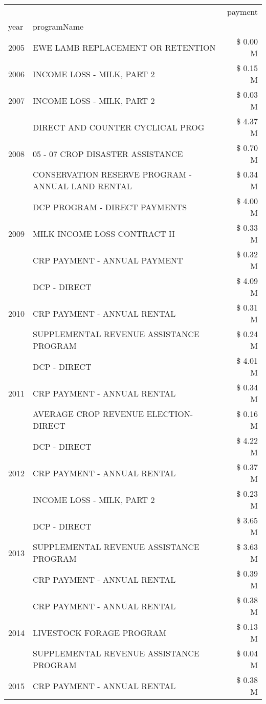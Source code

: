 \begin{tabular}{llr}
\toprule
 &  & payment \\
year & programName &  \\
\midrule
2005 & EWE LAMB REPLACEMENT OR RETENTION & \$ 0.00 M \\
\cline{1-3}
2006 & INCOME LOSS - MILK, PART 2 & \$ 0.15 M \\
\cline{1-3}
2007 & INCOME LOSS - MILK, PART 2 & \$ 0.03 M \\
\cline{1-3}
\multirow[t]{3}{*}{2008} & DIRECT AND COUNTER CYCLICAL PROG & \$ 4.37 M \\
 & 05 - 07 CROP DISASTER ASSISTANCE & \$ 0.70 M \\
 & CONSERVATION RESERVE PROGRAM - ANNUAL LAND RENTAL & \$ 0.34 M \\
\cline{1-3}
\multirow[t]{3}{*}{2009} & DCP PROGRAM - DIRECT PAYMENTS & \$ 4.00 M \\
 & MILK INCOME LOSS CONTRACT II & \$ 0.33 M \\
 & CRP PAYMENT - ANNUAL PAYMENT & \$ 0.32 M \\
\cline{1-3}
\multirow[t]{3}{*}{2010} & DCP - DIRECT & \$ 4.09 M \\
 & CRP PAYMENT - ANNUAL RENTAL & \$ 0.31 M \\
 & SUPPLEMENTAL REVENUE ASSISTANCE PROGRAM & \$ 0.24 M \\
\cline{1-3}
\multirow[t]{3}{*}{2011} & DCP - DIRECT & \$ 4.01 M \\
 & CRP PAYMENT - ANNUAL RENTAL & \$ 0.34 M \\
 & AVERAGE CROP REVENUE ELECTION-DIRECT & \$ 0.16 M \\
\cline{1-3}
\multirow[t]{3}{*}{2012} & DCP - DIRECT & \$ 4.22 M \\
 & CRP PAYMENT - ANNUAL RENTAL & \$ 0.37 M \\
 & INCOME LOSS - MILK, PART 2 & \$ 0.23 M \\
\cline{1-3}
\multirow[t]{3}{*}{2013} & DCP - DIRECT & \$ 3.65 M \\
 & SUPPLEMENTAL REVENUE ASSISTANCE PROGRAM & \$ 3.63 M \\
 & CRP PAYMENT - ANNUAL RENTAL & \$ 0.39 M \\
\cline{1-3}
\multirow[t]{3}{*}{2014} & CRP PAYMENT - ANNUAL RENTAL & \$ 0.38 M \\
 & LIVESTOCK FORAGE PROGRAM & \$ 0.13 M \\
 & SUPPLEMENTAL REVENUE ASSISTANCE PROGRAM & \$ 0.04 M \\
\cline{1-3}
\multirow[t]{3}{*}{2015} & CRP PAYMENT - ANNUAL RENTAL & \$ 0.38 M \\

\end{tabular}
